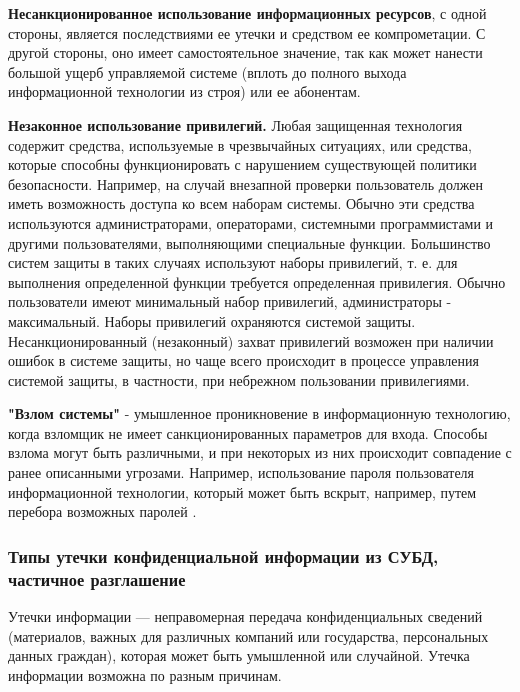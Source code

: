 \textbf{Несанкционированное использование информационных ресурсов}, с одной стороны, является
последствиями ее утечки и средством ее компрометации. С другой стороны, оно имеет самостоятельное
значение, так как может нанести большой ущерб управляемой системе (вплоть до полного выхода
информационной технологии из строя) или ее абонентам.

\textbf{Незаконное использование привилегий.} Любая защищенная технология содержит
средства, используемые в чрезвычайных ситуациях, или средства, которые способны
функционировать с нарушением существующей политики безопасности. Например, на случай
внезапной проверки пользователь должен иметь возможность доступа ко всем наборам
системы. Обычно эти средства используются администраторами, операторами, системными
программистами и другими пользователями, выполняющими специальные функции.
Большинство систем защиты в таких случаях используют наборы привилегий, т. е. для
выполнения определенной функции требуется определенная привилегия. Обычно
пользователи имеют минимальный набор привилегий, администраторы - максимальный.
Наборы привилегий охраняются системой защиты. Несанкционированный (незаконный)
захват привилегий возможен при наличии ошибок в системе защиты, но чаще всего
происходит в процессе управления системой защиты, в частности, при небрежном
пользовании привилегиями.

\textbf{"Взлом системы"} - умышленное проникновение в информационную технологию, когда взломщик не
имеет санкционированных параметров для входа. Способы взлома могут быть различными, и при некоторых
из них происходит совпадение с ранее описанными угрозами. Например, использование пароля пользователя
информационной технологии, который может быть вскрыт, например, путем перебора возможных паролей \cite{system-hack}.


\subsubsection{Типы утечки конфиденциальной информации из СУБД, частичное разглашение}

Утечки информации — неправомерная передача конфиденциальных сведений (материалов, важных для различных
компаний или государства, персональных данных граждан), которая может быть умышленной или случайной.
Утечка информации возможна по разным причинам.

